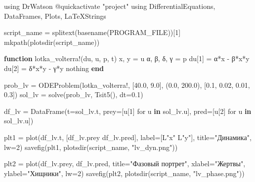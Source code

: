 \documentclass[
  english,
  russian,
  12pt,
  a4paper,
  DIV=11,
  numbers=noendperiod]{scrartcl}
\newenvironment{Shaded}{\begin{snugshade}}{\end{snugshade}}
\newcommand{\BuiltInTok}[1]{\textcolor[rgb]{0.00,0.23,0.31}{#1}}
\newcommand{\ConstantTok}[1]{\textcolor[rgb]{0.56,0.35,0.01}{#1}}
\newcommand{\FloatTok}[1]{\textcolor[rgb]{0.68,0.00,0.00}{#1}}
\newcommand{\FunctionTok}[1]{\textcolor[rgb]{0.28,0.35,0.67}{#1}}
\newcommand{\ImportTok}[1]{\textcolor[rgb]{0.00,0.46,0.62}{#1}}
\newcommand{\KeywordTok}[1]{\textcolor[rgb]{0.00,0.23,0.31}{\textbf{#1}}}
\newcommand{\NormalTok}[1]{\textcolor[rgb]{0.00,0.23,0.31}{#1}}
\newcommand{\OperatorTok}[1]{\textcolor[rgb]{0.37,0.37,0.37}{#1}}
\newcommand{\PreprocessorTok}[1]{\textcolor[rgb]{0.68,0.00,0.00}{#1}}
\newcommand{\StringTok}[1]{\textcolor[rgb]{0.13,0.47,0.30}{#1}}
\begin{document}
\begin{Shaded}
\begin{Highlighting}[]
\ImportTok{using} \BuiltInTok{DrWatson}
\PreprocessorTok{@quickactivate} \StringTok{"project"}
\ImportTok{using} \BuiltInTok{DifferentialEquations}\NormalTok{, }\BuiltInTok{DataFrames}\NormalTok{, }\BuiltInTok{Plots}\NormalTok{, }\BuiltInTok{LaTeXStrings}

\NormalTok{script\_name }\OperatorTok{=} \FunctionTok{splitext}\NormalTok{(}\FunctionTok{basename}\NormalTok{(}\ConstantTok{PROGRAM\_FILE}\NormalTok{))[}\FloatTok{1}\NormalTok{]}
\FunctionTok{mkpath}\NormalTok{(}\FunctionTok{plotsdir}\NormalTok{(script\_name))}

\KeywordTok{function} \FunctionTok{lotka\_volterra!}\NormalTok{(du, u, p, t)}
\NormalTok{    x, y }\OperatorTok{=}\NormalTok{ u}
\NormalTok{    α, β, δ, γ }\OperatorTok{=}\NormalTok{ p}
\NormalTok{    du[}\FloatTok{1}\NormalTok{] }\OperatorTok{=}\NormalTok{ α}\OperatorTok{*}\NormalTok{x }\OperatorTok{{-}}\NormalTok{ β}\OperatorTok{*}\NormalTok{x}\OperatorTok{*}\NormalTok{y}
\NormalTok{    du[}\FloatTok{2}\NormalTok{] }\OperatorTok{=}\NormalTok{ δ}\OperatorTok{*}\NormalTok{x}\OperatorTok{*}\NormalTok{y }\OperatorTok{{-}}\NormalTok{ γ}\OperatorTok{*}\NormalTok{y}
    \ConstantTok{nothing}
\KeywordTok{end}

\NormalTok{prob\_lv }\OperatorTok{=} \FunctionTok{ODEProblem}\NormalTok{(lotka\_volterra!, [}\FloatTok{40.0}\NormalTok{, }\FloatTok{9.0}\NormalTok{], (}\FloatTok{0.0}\NormalTok{, }\FloatTok{200.0}\NormalTok{), [}\FloatTok{0.1}\NormalTok{, }\FloatTok{0.02}\NormalTok{, }\FloatTok{0.01}\NormalTok{, }\FloatTok{0.3}\NormalTok{])}
\NormalTok{sol\_lv }\OperatorTok{=} \FunctionTok{solve}\NormalTok{(prob\_lv, }\FunctionTok{Tsit5}\NormalTok{(), dt}\OperatorTok{=}\FloatTok{0.1}\NormalTok{)}

\NormalTok{df\_lv }\OperatorTok{=} \FunctionTok{DataFrame}\NormalTok{(t}\OperatorTok{=}\NormalTok{sol\_lv.t, prey}\OperatorTok{=}\NormalTok{[u[}\FloatTok{1}\NormalTok{] for u }\KeywordTok{in}\NormalTok{ sol\_lv.u], pred}\OperatorTok{=}\NormalTok{[u[}\FloatTok{2}\NormalTok{] for u }\KeywordTok{in}\NormalTok{ sol\_lv.u])}

\NormalTok{plt1 }\OperatorTok{=} \FunctionTok{plot}\NormalTok{(df\_lv.t, [df\_lv.prey df\_lv.pred], label}\OperatorTok{=}\NormalTok{[L}\StringTok{"x"}\NormalTok{ L}\StringTok{"y"}\NormalTok{], title}\OperatorTok{=}\StringTok{"Динамика"}\NormalTok{, lw}\OperatorTok{=}\FloatTok{2}\NormalTok{)}
\FunctionTok{savefig}\NormalTok{(plt1, }\FunctionTok{plotsdir}\NormalTok{(script\_name, }\StringTok{"lv\_dyn.png"}\NormalTok{))}

\NormalTok{plt2 }\OperatorTok{=} \FunctionTok{plot}\NormalTok{(df\_lv.prey, df\_lv.pred, title}\OperatorTok{=}\StringTok{"Фазовый портрет"}\NormalTok{, xlabel}\OperatorTok{=}\StringTok{"Жертвы"}\NormalTok{, ylabel}\OperatorTok{=}\StringTok{"Хищники"}\NormalTok{, lw}\OperatorTok{=}\FloatTok{2}\NormalTok{)}
\FunctionTok{savefig}\NormalTok{(plt2, }\FunctionTok{plotsdir}\NormalTok{(script\_name, }\StringTok{"lv\_phase.png"}\NormalTok{))}
\end{Highlighting}
\end{Shaded}
\end{document}
